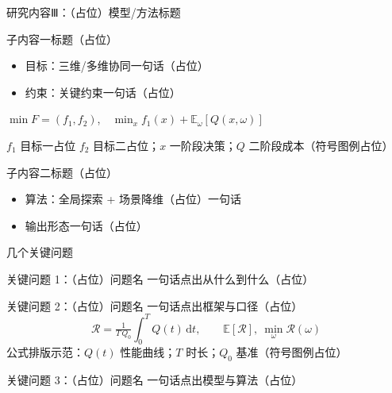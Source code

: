 \documentclass[aspectratio=169,11pt]{beamer}
\begin{document}
\begin{frame}{研究内容Ⅲ：（占位）模型/方法标题}
  \small
  \begin{dmupoint}{子内容一标题（占位）}
    \begin{itemize}
      \item \textcolor{dmuhead}{目标}：三维/多维协同一句话（占位）
      \item \textcolor{dmuhead}{约束}：关键约束一句话（占位）
    \end{itemize}
    \vskip0.6mm
    $\min F=(f_1,f_2)$,\ \ $\min_x f_1(x)+\mathbb{E}_\omega[Q(x,\omega)]$\par
    {\scriptsize\color{dmugray} $f_1$ 目标一占位 $f_2$ 目标二占位；$x$ 一阶段决策；$Q$ 二阶段成本（符号图例占位）}
  \end{dmupoint}
  \begin{dmupoint}{子内容二标题（占位）}
    \begin{itemize}
      \item \textcolor{dmuhead}{算法}：全局探索 + 场景降维（占位）一句话
      \item 输出形态一句话（占位）
    \end{itemize}
  \end{dmupoint}
\end{frame}

\begin{frame}{几个关键问题}
  \small
  \begin{dmupoint}{关键问题 1：（占位）问题名}
    一句话点出从什么到什么（占位）
  \end{dmupoint}
  \begin{dmupoint}{关键问题 2：（占位）问题名}
    一句话点出框架与口径（占位）
    \[ \mathcal{R}=\tfrac{1}{T\,Q_0}\textstyle\int_0^{T}\! Q(t)\,\mathrm{d}t,\qquad \mathbb{E}[\mathcal{R}],\ \min_\omega \mathcal{R}(\omega) \]
    {\scriptsize\color{dmugray} 公式排版示范：$Q(t)$ 性能曲线；$T$ 时长；$Q_0$ 基准（符号图例占位）}
  \end{dmupoint}
  \begin{dmupoint}{关键问题 3：（占位）问题名}
    一句话点出模型与算法（占位）
  \end{dmupoint}
\end{frame}
\end{document}
